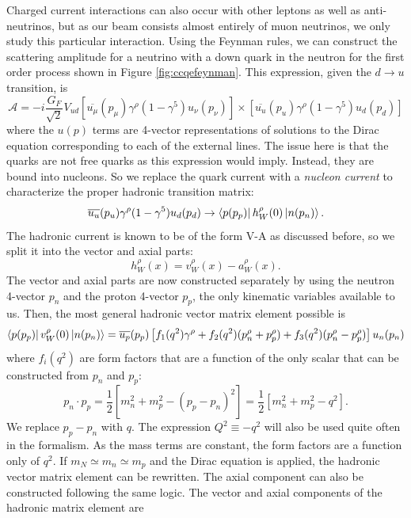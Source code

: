 Charged current interactions can also occur with other leptons as well as anti-neutrinos, but as our beam consists almost entirely of muon neutrinos, we only study this particular interaction. Using the Feynman rules, we can construct the scattering amplitude for a neutrino with a down quark in the neutron for the first order process shown in Figure \ref{fig:ccqefeynman}. This expression, given the $d \rightarrow u$ transition, is \cite{GKbook}
\begin{equation}
\mathcal{A} = -i \frac{G_F}{\sqrt{2}}V_{ud}\left[\overline{u_\mu}(p_\mu)\gamma^\rho (1-\gamma^5)u_\nu(p_\nu)\right] \times \left[\overline{u_u}(p_u)\gamma^\rho(1-\gamma^5)u_d(p_d)\right]
\end{equation}
where the $u(p)$ terms are 4-vector representations of solutions to the Dirac equation corresponding to each of the external lines. The issue here is that the quarks are not free quarks as this expression would imply. Instead, they are bound into nucleons. So we replace the quark current with a \emph{nucleon current} to characterize the proper hadronic transition matrix:
\begin{equation}
\overline{u_u}(p_u)\gamma^\rho(1-\gamma^5)u_d(p_d) \rightarrow \bra{p(p_p)} h^\rho_W (0) \ket{n(p_n)}.
\end{equation}
The hadronic current is known to be of the form V-A as discussed before, so we split it into the vector and axial parts:
\begin{equation}
h^\rho_W (x) = v^\rho_W(x) - a^\rho_W(x).
\end{equation}
The vector and axial parts are now constructed separately by using the neutron 4-vector $p_n$ and the proton 4-vector $p_p$, the only kinematic variables available to us. Then, the most general hadronic vector matrix element possible is
\begin{equation}
\bra{p(p_p)} v^\rho_W(0)\ket{n(p_n)} = \overline{u_p}(p_p)\left[ f_1(q^2) \gamma^\rho + f_2(q^2)(p^\rho_n + p^\rho_p) + f_3(q^2)(p^\rho_n - p^\rho_p)\right] u_n(p_n)
\end{equation}
where $f_i(q^2)$ are form factors that are a function of the only scalar that can be constructed from $p_n$ and $p_p$:
\begin{equation}
p_n \cdot p_p = \frac{1}{2}\left[m_n^2 +m_p^2 -(p_p-p_n)^2\right] = \frac{1}{2}\left[m_n^2+m_p^2-q^2\right].
\end{equation}
We replace $p_p-p_n$ with $q$. The expression $Q^2 \equiv -q^2$ will also be used quite often in the formalism. As the mass terms are constant, the form factors are a function only of $q^2$. If $m_N \simeq m_n \simeq m_p $ and the Dirac equation is applied, the hadronic vector matrix element can be rewritten. The axial component can also be constructed following the same logic. The vector and axial components of the hadronic matrix element are 
